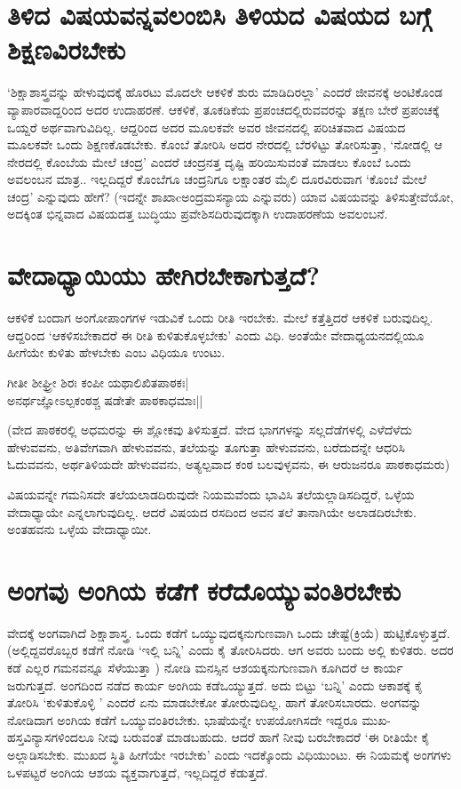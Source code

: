 \section*{ತಿಳಿದ ವಿಷಯವನ್ನವಲಂಬಿಸಿ ತಿಳಿಯದ ವಿಷಯದ ಬಗ್ಗೆ  ಶಿಕ್ಷಣವಿರಬೇಕು}

`ಶಿಕ್ಷಾಶಾಸ್ತ್ರವನ್ನು  ಹೇಳುವುದಕ್ಕೆ  ಹೊರಟು ಮೊದಲೇ ಆಕಳಿಕೆ  ಶುರು ಮಾಡಿದಿರಲ್ಲಾ' ಎಂದರೆ ಜೀವನಕ್ಕೆ  ಅಂಟಿಕೊಂಡ ವ್ಯಾಪಾರವಾದ್ದರಿಂದ ಅದರ ಉದಾಹರಣೆ. ಆಕಳಿಕೆ, ತೂಕಡಿಕೆಯ ಪ್ರಪಂಚದಲ್ಲಿರುವವರನ್ನು  ತಕ್ಷಣ  ಬೇರೆ  ಪ್ರಪಂಚಕ್ಕೆ   ಒಯ್ದರೆ ಅರ್ಥವಾಗುವಿದಿಲ್ಲ. ಆದ್ದರಿಂದ ಅದರ ಮೂಲಕವೇ ಅವರ ಜೀವನದಲ್ಲಿ ಪರಿಚಿತವಾದ ವಿಷಯದ ಮೂಲಕವೇ ಒಂದು ಶಿಕ್ಷಣಕೊಡಬೇಕು. ಕೊಂಬೆ ತೋರಿಸಿ ಅದರ ನೇರದಲ್ಲಿ ಬೆರಳಿಟ್ಟು  ತೋರಿಸುತ್ತಾ, `ನೋಡಲ್ಲಿ ಆ ನೇರದಲ್ಲಿ  ಕೊಂಬೆಯ ಮೇಲೆ ಚಂದ್ರ' ಎಂದರೆ  ಚಂದ್ರನತ್ತ  ದೃಷ್ಟಿ  ಹರಿಯಿಸುವಂತೆ  ಮಾಡಲು ಕೊಂಬೆ ಒಂದು ಅವಲಂಬನ ಮಾತ್ರ..  ಇಲ್ಲದಿದ್ದರೆ ಕೊಂಬೆಗೂ ಚಂದ್ರನಿಗೂ ಲಕ್ಷಾಂತರ ಮೈಲಿ ದೂರವಿರುವಾಗ `ಕೊಂಬೆ ಮೇಲೆ ಚಂದ್ರ' ಎನ್ನುವುದು ಹೇಗೆ? (ಇದನ್ನೇ ಶಾಖಾcಅಂದ್ರಮಸನ್ಯಾಯ  ಎನ್ನುವರು) ಯಾವ ವಿಷಯವನ್ನು ತಿಳಿಸುತ್ತೇವೆಯೋ, ಅದಕ್ಕಿಂತ  ಭಿನ್ನವಾದ ವಿಷಯದತ್ತ  ಬುದ್ಧಿಯು ಪ್ರವೇಶಿಸದಿರುವುದಕ್ಕಾಗಿ ಉದಾಹರಣೆಯ ಅವಲಂಬನೆ. 

\section*{ವೇದಾಧ್ಯಾಯಿಯು ಹೇಗಿರಬೇಕಾಗುತ್ತದೆ?}

ಆಕಳಿಕೆ ಬಂದಾಗ ಅಂಗೋಪಾಂಗಗಳ ಇಡುವಿಕೆ  ಒಂದು ರೀತಿ ಇರಬೇಕು. ಮೇಲೆ ಕತ್ತೆತ್ತಿದರೆ ಆಕಳಿಕೆ ಬರುವುದಿಲ್ಲ. ಆದ್ದರಿಂದ `ಆಕಳಿಸಬೇಕಾದರೆ ಈ ರೀತಿ ಕುಳಿತುಕೊಳ್ಳಬೇಕು' ಎಂದು ವಿಧಿ. ಅಂತೆಯೇ ವೇದಾಧ್ಯಯನದಲ್ಲಿಯೂ ಹೀಗೆಯೇ ಕುಳಿತು ಹೇಳಬೇಕು ಎಂಬ ವಿಧಿಯೂ ಉಂಟು.

\begin{shloka}
ಗೀತೀ ಶೀಘ್ರ್ರೀ ಶಿರಃ ಕಂಪೀ ಯಥಾಲಿಖಿತಪಾಠಕಃ|\label{5}\\
ಅನರ್ಥಜ್ಞೋಽಲ್ಪಕಂಠಶ್ಚ ಷಡೇತೇ ಪಾಠಕಾಧಮಾಃ||
\end{shloka}

(ವೇದ ಪಾಠಕರಲ್ಲಿ ಅಧಮರನ್ನು  ಈ ಶ್ಲೋಕವು ತಿಳಿಸುತ್ತದೆ. ವೇದ ಭಾಗಗಳನ್ನು  ಸಲ್ಲದೆಡೆಗಳಲ್ಲಿ  ಎಳೆದೆಳೆದು ಹೇಳುವವನು, ಅತಿವೇಗವಾಗಿ ಹೇಳುವವನು, ತಲೆಯನ್ನು  ತೂಗುತ್ತಾ ಹೇಳುವವನು, ಬರೆದುದನ್ನೇ ಆಧರಿಸಿ ಓದುವವನು, ಅರ್ಥತಿಳಿಯದೇ ಹೇಳುವವನು, ಅತ್ಯಲ್ಪವಾದ ಕಂಠ ಬಲವುಳ್ಳವನು, ಈ ಆರುಜನರೂ ಪಾಠಕಾಧಮರು)

ವಿಷಯವನ್ನೇ ಗಮನಿಸದೇ ತಲೆಯಲಾಡದಿರುವುದೇ ನಿಯಮವೆಂದು ಭಾವಿಸಿ ತಲೆಯಲ್ಲಾಡಿಸದಿದ್ದರೆ, ಒಳ್ಳೆಯ ವೇದಾಧ್ಯಾಯೇ ಎನ್ನಲಾಗುವುದಿಲ್ಲ. ಆದರೆ ವಿಷಯದ ರಸದಿಂದ ಅವನ ತಲೆ ತಾನಾಗಿಯೇ ಅಲಾಡದಿರಬೇಕು. ಅಂತಹವನು ಒಳ್ಳೆಯ ವೇದಾಧ್ಯಾಯೀ.

\section*{ಅಂಗವು ಅಂಗಿಯ ಕಡೆಗೆ ಕರೆದೊಯ್ಯುವಂತಿರಬೇಕು}

ವೇದಕ್ಕೆ  ಅಂಗವಾಗಿದೆ ಶಿಕ್ಷಾಶಾಸ್ತ್ರ. ಒಂದು ಕಡೆಗೆ ಒಯ್ಯುವುದಕ್ಕನುಗುಣವಾಗಿ ಒಂದು ಚೇಷ್ಟೆ(ಕ್ರಿಯೆ) ಹುಟ್ಟಿಕೊಳ್ಳುತ್ತದೆ. (ಅಲ್ಲಿದ್ದವರೊಬ್ಬರ ಕಡೆಗೆ ನೋಡಿ `ಇಲ್ಲಿ ಬನ್ನಿ' ಎಂದು ಕೈ ತೋರಿಸಿದರು. ಆಗ ಅವರು ಬಂದು ಅಲ್ಲಿ ಕುಳಿತರು. ಅದರ ಕಡೆ ಎಲ್ಲರ ಗಮನವನ್ನೂ  ಸೆಳೆಯುತ್ತಾ ) ನೋಡಿ ಮನಸ್ಸಿನ ಆಶಯಕ್ಕನುಗುಣವಾಗಿ ಕೂಗಿದರೆ ಆ ಕಾರ್ಯ ಜರುಗುತ್ತದೆ. ಅಂಗದಿಂದ ನಡೆದ ಕಾರ್ಯ ಅಂಗಿಯ ಕಡೆಒಯ್ಯುತ್ತದೆ. ಅದು ಬಿಟ್ಟು  `ಬನ್ನಿ' ಎಂದು  ಆಕಾಶಕ್ಕೆ  ಕೈ ತೋರಿಸಿ  `ಕುಳಿತುಕೊಳ್ಳಿ ' ಎಂದರೆ  ಏನು ಮಾಡಬೇಕೋ ತೋರುವುದಿಲ್ಲ. ಹಾಗೆ ತೋರಿಸಬಾರದು. ಅಂಗವನ್ನು  ನೋಡಿದಾಗ ಅಂಗಿಯ ಕಡೆಗೆ ಒಯ್ಯುವಂತಿರಬೇಕು. ಭಾಷೆಯನ್ನೇ ಉಪಯೋಗಿಸದೇ ಇದ್ದರೂ ಮುಖ-ಹಸ್ತವಿನ್ಯಾಸಗಳಿಂದಲೂ  ನೀವು ಬರುವಂತೆ ಮಾಡಬಹುದು. ಆದರೆ  ಹಾಗೆ ನೀವು ಬರಬೇಕಾದರೆ `ಈ ರೀತಿಯೇ ಕೈ ಅಲ್ಲಾಡಿಸಬೇಕು. ಮುಖದ ಸ್ಥಿತಿ  ಹೀಗೆಯೇ  ಇರಬೇಕು' ಎಂದು ಇದಕ್ಕೊಂದು ವಿಧಿಯುಂಟು. ಈ ನಿಯಮಕ್ಕೆ  ಅಂಗಗಳು ಒಳಪಟ್ಟರೆ ಅಂಗಿಯ ಆಶಯ ವ್ಯಕ್ತವಾಗುತ್ತದೆ, ಇಲ್ಲದಿದ್ದರೆ ಕೆಡುತ್ತದೆ.

